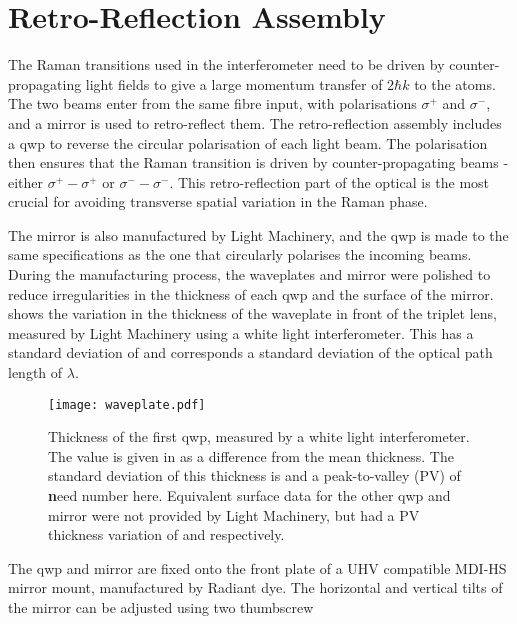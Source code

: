 \section{Retro-Reflection Assembly}\label{subsec:setup_ramanmirror} The
		Raman transitions used in the interferometer need to be driven by
		counter-propagating light fields to give a large momentum transfer of \(2
		\hbar k\) to the atoms. The two beams enter from the same fibre
    input, with polarisations $\sigma^+$ and $\sigma^-$, and a
		mirror is used to retro-reflect them. The retro-reflection assembly includes
		a \ac{qwp} to reverse the circular polarisation of each light
    beam. The polarisation then ensures that the Raman transition is
    driven by counter-propagating beams - either $\sigma^+ - \sigma^+$
    or $\sigma^- - \sigma^-$. This retro-reflection part of the
    optical
    is the most crucial for avoiding transverse spatial variation in
    the Raman phase.\par\noindent
		The mirror is also manufactured by Light Machinery, and the \ac{qwp} is made
		to the same specifications as the one that circularly polarises the incoming
		beams.  During the manufacturing process, the waveplates and mirror were
		polished to reduce irregularities in the thickness of each \ac{qwp} and the
		surface of the mirror.  shows the variation in
		the thickness of the waveplate in front of the triplet lens, measured by
		Light Machinery using a white light interferometer. This has a standard
		deviation of  and corresponds a standard
		deviation of the optical path length of \(\lambda\).
\begin{figure}[!htbp] 
  \centering
  \texttt{[image: waveplate.pdf]}
  \caption[Quarter-wave plate thickness variation.]{Thickness of the first \ac{qwp}, measured by a white light
		interferometer. The value is given in \sivalue{}{\nano\metre} as a
		difference from the mean thickness. The standard deviation of this thickness
		is  and a peak-to-valley (PV) of {\textbf need
		number here}. Equivalent surface data for the other \ac{qwp} and mirror were
		not provided by Light Machinery, but had a PV thickness variation of
		 and
		 respectively.} \label{fig:waveplate_map}
\end{figure} 
The \ac{qwp} and mirror are fixed onto the front
plate of a UHV compatible MDI-HS mirror mount, manufactured by Radiant dye. The
horizontal and vertical tilts of the mirror can be adjusted using two thumbscrew

